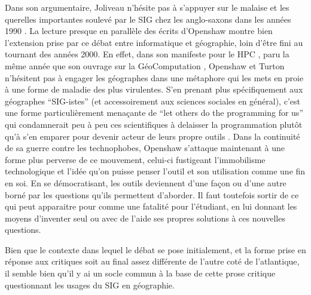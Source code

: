 Dans son argumentaire, Joliveau n'hésite pas à s'appuyer sur le malaise et les querelles importantes soulevé par le SIG chez les anglo-saxons dans les années 1990 \autocite[472-473]{Joliveau2004}. La lecture presque en parallèle des écrits d'Openshaw montre bien l'extension prise par ce débat entre informatique et géographie, loin d'être fini au tournant des années 2000. En effet, dans son manifeste pour le HPC \autocite[2]{Openshaw2000}, paru la même année que son ouvrage sur la GéoComputation \autocite{Openshaw2000b}, Openshaw et Turton n’hésitent pas à engager les géographes dans une métaphore qui les mets en proie à une forme de maladie des plus virulentes. S'en prenant plus spécifiquement aux géographes \enquote{SIG-istes} (et accessoirement aux sciences sociales en général), c’est une forme particulièrement menaçante de \foreignquote{english}{let others do the programming for us} qui condamnerait peu à peu ces scientifiques à delaisser la programmation plutôt qu’à s’en emparer pour devenir acteur de leurs propre outils . Dans la continuité de sa guerre contre les technophobes, Openshaw s'attaque  maintenant à une forme plus perverse de ce mouvement, celui-ci fustigeant l'immobilisme technologique et l'idée qu'on puisse penser l'outil et son utilisation comme une fin en soi. En se démocratisant, les outils deviennent d'une façon ou d'une autre borné par les questions qu'ils permettent d'aborder. Il faut toutefois sortir de ce qui peut apparaitre pour comme une fatalité pour l'étudiant, en lui donnant les moyens d'inventer seul ou avec de l'aide ses propres solutions à ces nouvelles questions.

Bien que le contexte dans lequel le débat se pose initialement, et la forme prise en réponse aux critiques soit au final assez différente de l'autre coté de l'atlantique, il semble bien qu'il y ai un socle commun à la base de cette prose critique questionnant les usages du SIG en géographie.


